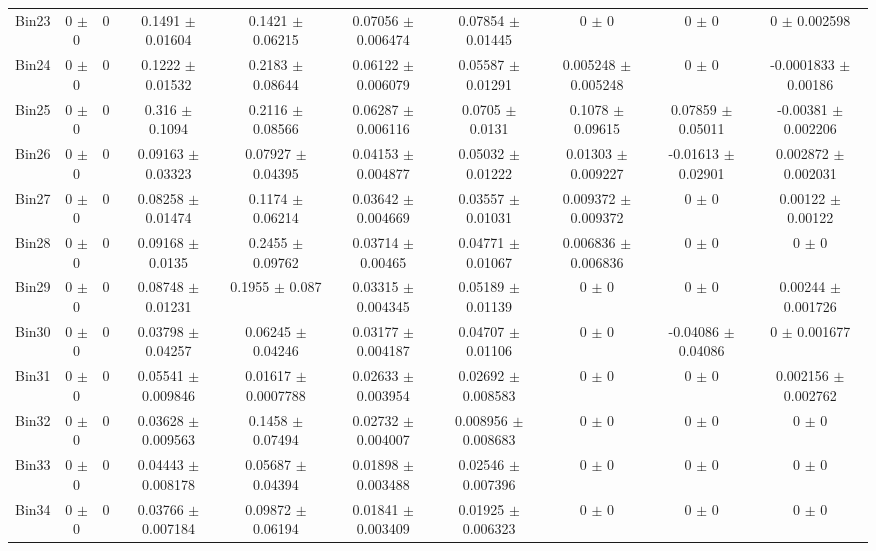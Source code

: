 \begin{tabular}{@{\extracolsep{4pt}}lccccccccc@{}}
     Bin23 & 0 $\pm$ 0 & 0 & 0.1491 $\pm$ 0.01604 & 0.1421 $\pm$ 0.06215 & 0.07056 $\pm$ 0.006474 & 0.07854 $\pm$ 0.01445 & 0 $\pm$ 0 & 0 $\pm$ 0 & 0 $\pm$ 0.002598 \\ 
     Bin24 & 0 $\pm$ 0 & 0 & 0.1222 $\pm$ 0.01532 & 0.2183 $\pm$ 0.08644 & 0.06122 $\pm$ 0.006079 & 0.05587 $\pm$ 0.01291 & 0.005248 $\pm$ 0.005248 & 0 $\pm$ 0 & -0.0001833 $\pm$ 0.00186 \\ 
     Bin25 & 0 $\pm$ 0 & 0 & 0.316 $\pm$ 0.1094 & 0.2116 $\pm$ 0.08566 & 0.06287 $\pm$ 0.006116 & 0.0705 $\pm$ 0.0131 & 0.1078 $\pm$ 0.09615 & 0.07859 $\pm$ 0.05011 & -0.00381 $\pm$ 0.002206 \\ 
     Bin26 & 0 $\pm$ 0 & 0 & 0.09163 $\pm$ 0.03323 & 0.07927 $\pm$ 0.04395 & 0.04153 $\pm$ 0.004877 & 0.05032 $\pm$ 0.01222 & 0.01303 $\pm$ 0.009227 & -0.01613 $\pm$ 0.02901 & 0.002872 $\pm$ 0.002031 \\ 
     Bin27 & 0 $\pm$ 0 & 0 & 0.08258 $\pm$ 0.01474 & 0.1174 $\pm$ 0.06214 & 0.03642 $\pm$ 0.004669 & 0.03557 $\pm$ 0.01031 & 0.009372 $\pm$ 0.009372 & 0 $\pm$ 0 & 0.00122 $\pm$ 0.00122 \\ 
     Bin28 & 0 $\pm$ 0 & 0 & 0.09168 $\pm$ 0.0135 & 0.2455 $\pm$ 0.09762 & 0.03714 $\pm$ 0.00465 & 0.04771 $\pm$ 0.01067 & 0.006836 $\pm$ 0.006836 & 0 $\pm$ 0 & 0 $\pm$ 0 \\ 
     Bin29 & 0 $\pm$ 0 & 0 & 0.08748 $\pm$ 0.01231 & 0.1955 $\pm$ 0.087 & 0.03315 $\pm$ 0.004345 & 0.05189 $\pm$ 0.01139 & 0 $\pm$ 0 & 0 $\pm$ 0 & 0.00244 $\pm$ 0.001726 \\ 
     Bin30 & 0 $\pm$ 0 & 0 & 0.03798 $\pm$ 0.04257 & 0.06245 $\pm$ 0.04246 & 0.03177 $\pm$ 0.004187 & 0.04707 $\pm$ 0.01106 & 0 $\pm$ 0 & -0.04086 $\pm$ 0.04086 & 0 $\pm$ 0.001677 \\ 
     Bin31 & 0 $\pm$ 0 & 0 & 0.05541 $\pm$ 0.009846 & 0.01617 $\pm$ 0.0007788 & 0.02633 $\pm$ 0.003954 & 0.02692 $\pm$ 0.008583 & 0 $\pm$ 0 & 0 $\pm$ 0 & 0.002156 $\pm$ 0.002762 \\ 
     Bin32 & 0 $\pm$ 0 & 0 & 0.03628 $\pm$ 0.009563 & 0.1458 $\pm$ 0.07494 & 0.02732 $\pm$ 0.004007 & 0.008956 $\pm$ 0.008683 & 0 $\pm$ 0 & 0 $\pm$ 0 & 0 $\pm$ 0 \\ 
     Bin33 & 0 $\pm$ 0 & 0 & 0.04443 $\pm$ 0.008178 & 0.05687 $\pm$ 0.04394 & 0.01898 $\pm$ 0.003488 & 0.02546 $\pm$ 0.007396 & 0 $\pm$ 0 & 0 $\pm$ 0 & 0 $\pm$ 0 \\ 
     Bin34 & 0 $\pm$ 0 & 0 & 0.03766 $\pm$ 0.007184 & 0.09872 $\pm$ 0.06194 & 0.01841 $\pm$ 0.003409 & 0.01925 $\pm$ 0.006323 & 0 $\pm$ 0 & 0 $\pm$ 0 & 0 $\pm$ 0 \\ 

\end{tabular}

